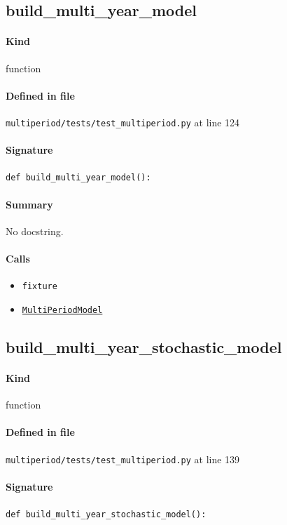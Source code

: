 \documentclass[11pt]{report}
\begin{document}
\subsection{build\_multi\_year\_model}
\label{def:multiperiod-tests-test_multiperiod.py:build_multi_year_model:L124}
\paragraph{Kind} function
\paragraph{Defined in file} \texttt{multiperiod/tests/test\_multiperiod.py} at line 124
\paragraph{Signature} \texttt{def build\_multi\_year\_model():}
\paragraph{Summary} No docstring.
\paragraph{Calls}
\begin{itemize}[leftmargin=*]
  \item \texttt{fixture}
  \item \hyperref[def:multiperiod-multiperiod.py:MultiPeriodModel:L24]{\texttt{MultiPeriodModel}}
\end{itemize}
\subsection{build\_multi\_year\_stochastic\_model}
\label{def:multiperiod-tests-test_multiperiod.py:build_multi_year_stochastic_model:L139}
\paragraph{Kind} function
\paragraph{Defined in file} \texttt{multiperiod/tests/test\_multiperiod.py} at line 139
\paragraph{Signature} \texttt{def build\_multi\_year\_stochastic\_model():}
\end{document}
